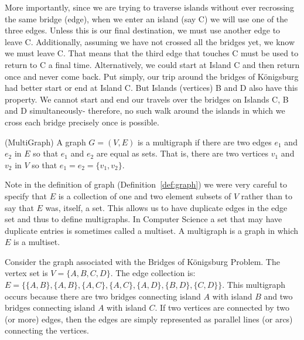 More importantly, since we are trying to traverse islands without ever recrossing the same bridge (edge), when we enter an island (say C) we will use one of the three edges.
Unless this is our final destination, we must use another edge to leave C.
Additionally, assuming we have not crossed all the bridges yet, we know we must leave C.
That means that the third edge that touches C must be used to return to C a final time.
Alternatively, we could start at Island C and then return once and never come back.
Put simply, our trip around the bridges of Königsburg had better start or end at Island C.
But Islands (vertices) B and D also have this property.
We cannot start and end our travels over the bridges on Islands C, B and D simultaneously- therefore, no such walk around the islands in which we cross each bridge precisely once is possible.

\begin{definition}{(MultiGraph)}
A graph \(G = (V,E)\) is a multigraph if there are two edges \(e_1\) and \(e_2\) in \(E\) so that \(e_1\) and \(e_2\) are equal as sets.
That is, there are two vertices \(v_1\) and \(v_2\) in \(V\)  so that \(e_1=e_2=\{v_1,v_2\}\).
\end{definition}
\begin{remark}
Note in the definition of graph (Definition~\ref{def:graph}) we were very careful to specify that \(E\) is a collection of one and two element subsets of \(V\) rather than to say that \(E\) was, itself, a set.
This allows us to have duplicate edges in the edge set and thus to define multigraphs.
In Computer Science a set that may have duplicate entries is sometimes called a multiset.
A multigraph is a graph in which \(E\) is a multiset.
\end{remark}

Consider the graph associated with the Bridges of Königsburg Problem.
The vertex set is \(V = \{A, B, C, D\}\).
The edge collection is: \(E = \{\{A,B\},\allowbreak\{A,B\},\allowbreak\{A,C\},\allowbreak\{A,C\},\allowbreak\{A,D\},\allowbreak\{B,D\},\allowbreak\{C,D\}\}\).
This multigraph occurs because there are two bridges connecting island \(A\) with island \(B\) and two bridges connecting island \(A\) with island \(C\).
If two vertices are connected by two (or more) edges, then the edges are simply represented as parallel lines (or arcs) connecting the vertices.

